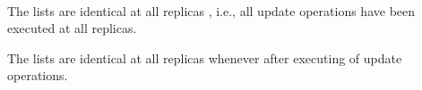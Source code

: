 
\begin{frame}{}
  \begin{center}
     \\ 
  \end{center}
\end{frame}

\begin{frame}{}
  \begin{definition}
    The lists are identical at all replicas , i.e.,
    all update operations have been executed at all replicas.
  \end{definition}

  \pause
  \vspace{0.50cm}
  \begin{definition}
    The lists are identical at all replicas whenever after executing  of update operations.
  \end{definition}

  \pause
  \vspace{0.60cm}
  \centerline{}
\end{frame}
